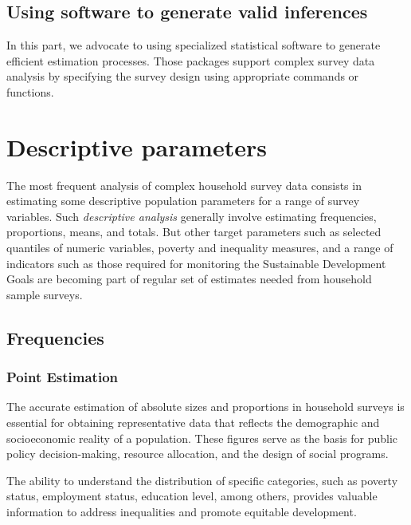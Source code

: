 \documentclass[
  12pt,
]{book}
\begin{document}
\hypertarget{using-software-to-generate-valid-inferences}{%
\section{Using software to generate valid inferences}\label{using-software-to-generate-valid-inferences}}

In this part, we advocate to using specialized statistical software to generate efficient estimation processes. Those packages support complex survey data analysis by specifying the survey design using appropriate commands or functions.

\hypertarget{descriptive-parameters}{%
\chapter{Descriptive parameters}\label{descriptive-parameters}}

The most frequent analysis of complex household survey data consists in estimating some descriptive population parameters for a range of survey variables. Such \emph{descriptive analysis} generally involve estimating frequencies, proportions, means, and totals. But other target parameters such as selected quantiles of numeric variables, poverty and inequality measures, and a range of indicators such as those required for monitoring the Sustainable Development Goals are becoming part of regular set of estimates needed from household sample surveys.

\hypertarget{frequencies}{%
\section{Frequencies}\label{frequencies}}

\hypertarget{point-estimation}{%
\subsection{Point Estimation}\label{point-estimation}}

The accurate estimation of absolute sizes and proportions in household surveys is essential for obtaining representative data that reflects the demographic and socioeconomic reality of a population. These figures serve as the basis for public policy decision-making, resource allocation, and the design of social programs.

The ability to understand the distribution of specific categories, such as poverty status, employment status, education level, among others, provides valuable information to address inequalities and promote equitable development.
\end{document}
